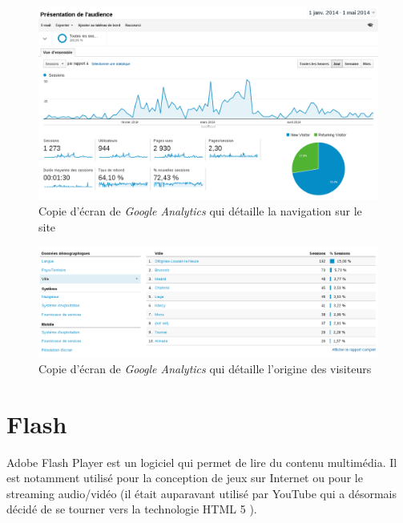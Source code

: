 \begin{figure}[h]
	\centering
	\includegraphics[scale=0.4]{examples/Google_Analytics_1.png}
	\caption{\label{Google_Analytics_1}Copie d'écran de \textit{Google Analytics} qui détaille la navigation sur le site}
\end{figure}

\begin{figure}[h]
	\centering
	\includegraphics[scale=0.4]{examples/Google_Analytics_2.png}
	\caption{\label{Google_Analytics_2}Copie d'écran de \textit{Google Analytics} qui détaille l'origine des visiteurs}
\end{figure}

\section{Flash}
Adobe Flash Player \cite{flash_website} est un logiciel qui permet de lire du contenu multimédia. Il est notamment utilisé pour la conception de jeux sur Internet ou pour le streaming audio/vidéo (il était auparavant utilisé par YouTube qui a désormais décidé de se tourner vers la technologie HTML 5 \cite{youtube_html5}).
\newline

